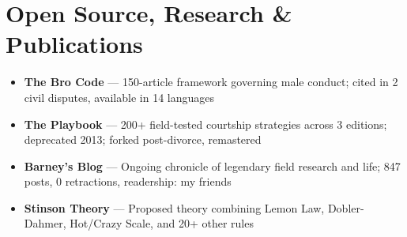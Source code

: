 \documentclass[letterpaper,10.5pt]{article}
\begin{document}
\section*{Open Source, Research \& Publications}
\begin{itemize}
  \item \textbf{The Bro Code} --- 150-article framework governing male conduct; cited in 2 civil disputes, available in 14 languages
  \item \textbf{The Playbook} --- 200+ field-tested courtship strategies across 3 editions; deprecated 2013; forked post-divorce, remastered
  \item \textbf{Barney's Blog} --- Ongoing chronicle of legendary field research and life; 847 posts, 0 retractions, readership: my friends
  \item \textbf{Stinson Theory} --- Proposed theory combining Lemon Law, Dobler-Dahmer, Hot/Crazy Scale, and 20+ other rules
\end{itemize}
\end{document}
